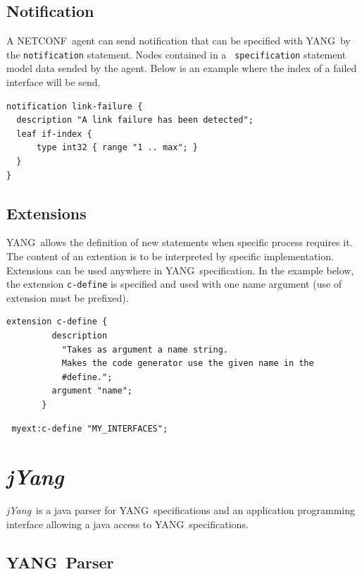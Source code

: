 \documentclass[a4paper]{article}
\newcommand{\jyang}{{\sl jYang}}
\newcommand{\nc}{NETCONF}
\newcommand{\y}{YANG}
\begin{document}
\subsection{Notification}

A \nc\ agent  can send notification that can be  specified with \y\ by
the  {\tt   notification}  statement.   Nodes  contained   in  a  {\tt
specification} statement model  data sended by the agent.  Below is an
example where the index of a failed interface will be send.

\begin{verbatim} 
notification link-failure {
  description "A link failure has been detected";
  leaf if-index {
      type int32 { range "1 .. max"; }
  }
}
\end{verbatim}

\subsection{Extensions}

\y\  allows the  definition of  new statements  when  specific process
requires  it. The  content of  an extention  is to  be  interpreted by
specific  implementation.   Extensions can  be  used  anywhere in  \y\
specification. In  the example below, the extension  {\tt c-define} is
specified  and used  with one  name  argument (use of extension must  be
prefixed).

\begin{verbatim}
extension c-define {
         description
           "Takes as argument a name string.
           Makes the code generator use the given name in the
           #define.";
         argument "name";
       }
\end{verbatim}

\begin{verbatim}
 myext:c-define "MY_INTERFACES";
\end{verbatim}




\section{\jyang}

\jyang\ is  a java  parser for \y\  specifications and  an application
programming    interface    allowing   a    java    access   to    \y\
specifications. 

\subsection{\y\ Parser}
\end{document}
